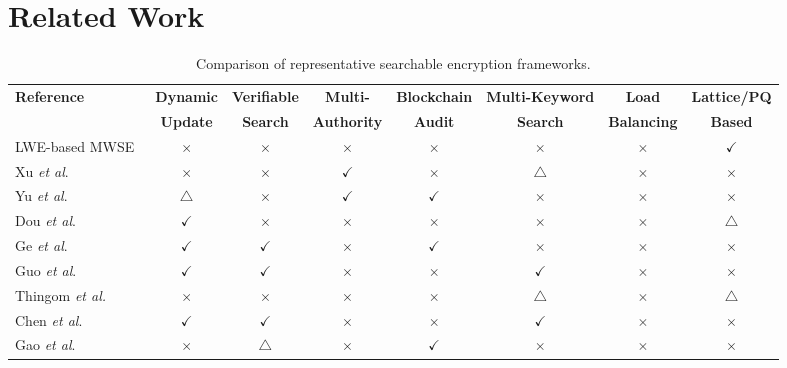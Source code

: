 \documentclass{ieeetj}
\theoremstyle{ieee-style}
\begin{document}
\section{Related Work}
\begin{table}[t]
\centering
\caption{Comparison of representative searchable encryption frameworks.}
\label{tab:comparison}
\renewcommand{\arraystretch}{1.1}
\setlength{\tabcolsep}{5pt}

\begin{tabular}{lccccccc}
\hline
\textbf{Reference} &
\textbf{Dynamic} &
\textbf{Verifiable} &
\textbf{Multi-} &
\textbf{Blockchain} &
\textbf{Multi-Keyword} &
\textbf{Load} &
\textbf{Lattice/PQ} \\
&
\textbf{Update} &
\textbf{Search} &
\textbf{Authority} &
\textbf{Audit} &
\textbf{Search} &
\textbf{Balancing} &
\textbf{Based} \\
\hline

LWE-based MWSE~\cite{ref16}
& $\times$ & $\times$ & $\times$ & $\times$ & $\times$ & $\times$ & $\checkmark$ \\

Xu \textit{et al}.~\cite{ref26}
& $\times$ & $\times$ & $\checkmark$ & $\times$ & $\triangle$ & $\times$ & $\times$ \\

Yu \textit{et al}.~\cite{ref28}
& $\triangle$ & $\times$ & $\checkmark$ & $\checkmark$ & $\times$ & $\times$ & $\times$ \\

Dou \textit{et al}.~\cite{ref29}
& $\checkmark$ & $\times$ & $\times$ & $\times$ & $\times$ & $\times$ & $\triangle$ \\

Ge \textit{et al}.~\cite{ref30}
& $\checkmark$ & $\checkmark$ & $\times$ & $\checkmark$ & $\times$ & $\times$ & $\times$ \\

Guo \textit{et al}.~\cite{ref35}
& $\checkmark$ & $\checkmark$ & $\times$ & $\times$ & $\checkmark$ & $\times$ & $\times$ \\

Thingom \textit{et al.}~\cite{ref41}
& $\times$ & $\times$ & $\times$ & $\times$ & $\triangle$ & $\times$ & $\triangle$ \\

Chen \textit{et al}.~\cite{ref46}
& $\checkmark$ & $\checkmark$ & $\times$ & $\times$ & $\checkmark$ & $\times$ & $\times$ \\

Gao \textit{et al}.~\cite{ref47}
& $\times$ & $\triangle$ & $\times$ & $\checkmark$ & $\times$ & $\times$ & $\times$ \\


\end{tabular}
\end{table}
\end{document}
